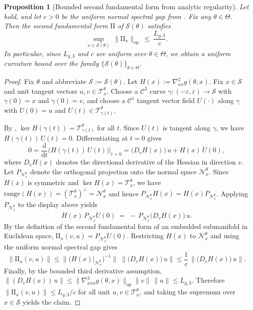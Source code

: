 \documentclass{article}
\theoremstyle{normaltheorem}
\newtheorem{proposition}[proposition]{Proposition}
\newcommand{\ud}{\mathrm{d}}
\newcommand{\calS}{\mathcal{S}}
\newcommand{\calT}{\mathcal{T}}
\newcommand{\calN}{\mathcal{N}}
\begin{document}
\begin{proposition}[Bounded second fundamental form from analytic regularity]\label{prop:second-fund-from-g}
Let  hold, and let \(c>0\) be the uniform normal spectral gap from
. Fix any $\theta\in\Theta$. Then the second fundamental form $\mathrm{II}$ of $\calS(\theta)$ satisfies
\[
\sup_{x\in \calS(\theta)}\ \|\mathrm{II}_x\|_{\mathrm{op}}\ \le\ \frac{L_{g,3}}{c}.
\]
In particular, since \(L_{g,3}\) and \(c\) are uniform over \(\theta\in\Theta\), we obtain a uniform curvature bound over the family \(\{\calS(\theta)\}_{\theta\in\Theta}\).
\end{proposition}

\begin{proof}
Fix $\theta$ and abbreviate \(\mathcal{S}:=\calS(\theta)\).
Let $H(x):=\nabla^2_{xx}g(\theta,x)$.
Fix $x\in \mathcal{S}$ and unit tangent vectors $u,v\in\calT_x^\theta$.
Choose a $\mathcal{C}^{2}$ curve $\gamma:(-\varepsilon,\varepsilon)\to \mathcal{S}$ with $\gamma(0)=x$ and $\dot\gamma(0)=v$,
and choose a $\mathcal{C}^{1}$ tangent vector field $U(\cdot)$ along $\gamma$ with $U(0)=u$ and $U(t)\in\calT_{\gamma(t)}^\theta$.

By , \(\ker H(\gamma(t))=\calT_{\gamma(t)}^\theta\) for all \(t\). Since \(U(t)\) is tangent along
\(\gamma\), we have \(H(\gamma(t))\,U(t)=0\).
Differentiating at $t=0$ gives
\[
0
=\frac{\ud}{\ud t}\Big(H(\gamma(t))\,U(t)\Big)\Big|_{t=0}
=\big(D_v H(x)\big)\,u+H(x)\,\dot U(0),
\]
where $D_v H(x)$ denotes the directional derivative of the Hessian in direction $v$.
Let $P_{\calN_x^\theta}$ denote the orthogonal projection onto the normal space $\calN_x^\theta$.
Since $H(x)$ is symmetric and $\ker H(x)=\calT_x^\theta$, we have $\mathrm{range}(H(x))=(\calT_x^\theta)^\perp=\calN_x^\theta$ and hence
$P_{\calN_x^\theta}H(x)=H(x)P_{\calN_x^\theta}$.
Applying $P_{\calN_x^\theta}$ to the display above yields
\[
H(x)\,P_{\calN_x^\theta}\dot U(0) \;=\; -\,P_{\calN_x^\theta}\big(D_v H(x)\big)\,u.
\]
By the definition of the second fundamental form of an embedded submanifold in Euclidean space,
$\mathrm{II}_x(v,u)=P_{\calN_x^\theta}\dot U(0)$.
Restricting $H(x)$ to $\calN_x^\theta$ and using the uniform normal spectral gap gives
\[
\|\mathrm{II}_x(v,u)\|
\le \big\|\big(H(x)|_{\calN_x^\theta}\big)^{-1}\big\|\;\big\|\big(D_v H(x)\big)\,u\big\|
\le \frac{1}{c}\,\big\|\big(D_v H(x)\big)\,u\big\|.
\]
Finally, by the bounded third derivative assumption,
\(
\|(D_v H(x))\,u\|\le \|\nabla^3_{xxx}g(\theta,x)\|_{\mathrm{op}}\|v\|\,\|u\|\le L_{g,3}.
\)
Therefore $\|\mathrm{II}_x(v,u)\|\le L_{g,3}/c$ for all unit $u,v\in\calT_x^\theta$, and taking the supremum over $x\in \mathcal{S}$ yields the claim.
\end{proof}
\end{document}
